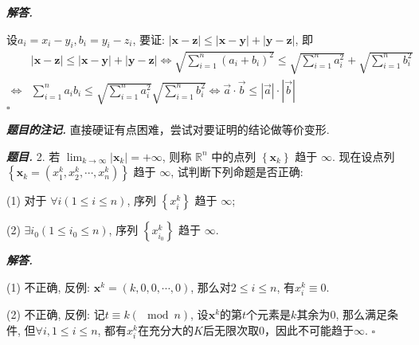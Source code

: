 \documentclass[10pt, a4paper, oneside]{ctexart}
\newenvironment{problem}{\begin{framed}\par\noindent\textbf{\textit{题目. }}}{\end{framed}\par}
\newenvironment{solution}{%
  \par\noindent\textbf{\textit{解答. }}\ignorespaces
}{%
  \hfill\ensuremath{\square}\par %
}
\newenvironment{note}{\par\noindent\textbf{\textit{题目的注记. }}\ignorespaces}{\par}
\begin{document}
\begin{solution}
设$a_i=x_i-y_i, b_i=y_i-z_i$, 要证: $|\bm{x}-\bm{z}|\leq |\bm{x}-\bm{y}|+|\bm{y}-\bm{z}|$, 即
\begin{align*}
    &|\bm{x}-\bm{z}|\leq |\bm{x}-\bm{y}|+|\bm{y}-\bm{z}| \iff \sqrt{\sum_{i=1}^n (a_i+b_i)^2}\leq \sqrt{\sum_{i=1}^n a_i^2}+\sqrt{\sum_{i=1}^n b_i^2}\\\iff& \sum_{i=1}^n a_ib_i\leq \sqrt{\sum_{i=1}^n a_i^2}\sqrt{\sum_{i=1}^n b_i^2}\iff \vec{a}\cdot \vec{b}\leq |\vec{a}|\cdot|\vec{b}|
\end{align*}
\end{solution}
\begin{note}
    直接硬证有点困难，尝试对要证明的结论做等价变形.
\end{note}

\begin{problem}
2. 若 $\lim _{k \rightarrow \infty}\left|\boldsymbol{x}_k\right|=+\infty$, 则称 $\mathbb{R}^n$ 中的点列 $\left\{\boldsymbol{x}_k\right\}$ 趋于 $\infty$. 现在设点列 $\left\{\boldsymbol{x}_k=\left(x_1^k, x_2^k, \cdots, x_n^k\right)\right\}$ 趋于 $\infty$, 试判断下列命题是否正确:

(1) 对于 $\forall i(1 \leqslant i \leqslant n)$, 序列 $\left\{x_i^k\right\}$ 趋于 $\infty$;

(2) $\exists i_0\left(1 \leqslant i_0 \leqslant n\right)$, 序列 $\left\{x_{i_0}^k\right\}$ 趋于 $\infty$.
\end{problem}
\begin{solution}
    (1) 不正确, 反例: $\bm{x}^k=(k,0,0,\cdots,0)$, 那么对$2\leq i\leq n$, 有$x_i^k\equiv 0$.
    
    (2) 不正确, 反例: 记$t\equiv k (\mod n)$, 设$\bm{x}^k$的第$t$个元素是$k$其余为$0$, 那么满足条件, 但$\forall i, 1\leq i \leq n$, 都有$x_{i}^k$在充分大的$K$后无限次取$0$，因此不可能趋于$\infty$.
\end{solution}
\end{document}

